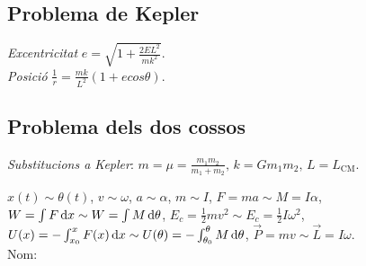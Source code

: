 \documentclass[10pt]{article}
\newcommand{\lp}{\left(}
\newcommand{\rp}{\right)}
\begin{document}
\begin{multicols}{4}
\subsection{Problema de Kepler}
\emph{Excentricitat} $e = \sqrt{1 + \frac{2EL^2}{mk^2}}$.\\
\emph{Posició} $\frac{1}{r} = \frac{mk}{L^2} \lp 1 + e cos \theta \rp$.

\subsection{Problema dels dos cossos}
\emph{Substitucions a Kepler}: $m = \mu = \frac{m_1m_2}{m_1+m_2},\, k = Gm_1m_2, \, L = L_\text{CM}$.

\ifland
\noindent\makebox[\linewidth]{\rule{\linewidth}{0.5pt}}
$x(t) \sim \theta(t)$, $v \sim \omega$, $a \sim \alpha$, $m \sim I$, $F = ma \sim M = I\alpha$, $W = \int F \dif x \sim W = \int M \dif \theta$, $E_c = \frac{1}{2}mv^2 \sim E_c = \frac{1}{2} I\omega^2$, $U(x) = -\int_{x_0}^x F(x) \dif x \sim U(\theta) = -\int_{\theta_0}^\theta M \dif \theta$, $\vec{P} = mv \sim \vec{L} = I\omega$. \\
\vspace{15pt}
\raggedleft
{\Large Nom: \underline{\hspace{5cm}}}


\end{multicols}

\fi
\end{document}

